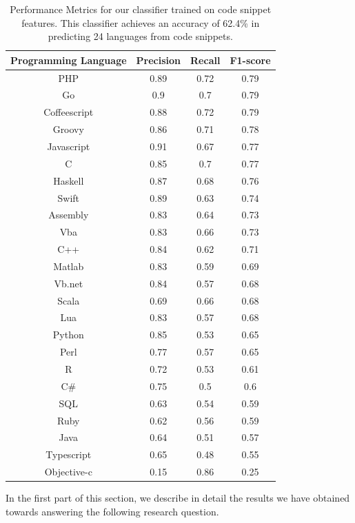 \documentclass[letterpaper, 10 pt, conference]{ieeeconf}  %
\begin{document}
 
\begin{table}[t]
  \centering
  \begin{tabular}{| c | c | c | c |}
     \hline
      Programming Language & Precision & Recall  & F1-score\\ \hline
PHP&	0.89&	0.72&	0.79\\ \hline
Go	&0.9	&0.7&	0.79\\ \hline
Coffeescript&	0.88&	0.72	&0.79\\ \hline
Groovy	&0.86	&0.71	&0.78\\ \hline
Javascript	&0.91&	0.67&	0.77\\ \hline
C	&0.85	&0.7&	0.77\\ \hline
Haskell	&0.87&	0.68	&0.76\\ \hline
Swift	&0.89&	0.63	&0.74\\ \hline
Assembly&	0.83&	0.64&	0.73\\ \hline
Vba&	0.83&	0.66&	0.73\\ \hline
C++	&0.84	&0.62&	0.71\\ \hline
Matlab&	0.83	&0.59&	0.69\\ \hline
Vb.net&	0.84&	0.57	&0.68\\ \hline
Scala&	0.69&	0.66	&0.68\\ \hline
Lua&	0.83&	0.57&	0.68\\ \hline
Python&	0.85&	0.53&	0.65\\ \hline
Perl	&0.77&	0.57&	0.65\\ \hline
R	&0.72	&0.53&	0.61\\ \hline
C\#&	0.75&	0.5&	0.6\\ \hline
SQL&	0.63&	0.54&	0.59\\ \hline
Ruby&	0.62&	0.56&	0.59\\ \hline
Java&	0.64&	0.51&	0.57\\ \hline
Typescript&	0.65&	0.48&	0.55\\ \hline
Objective-c&	0.15&	0.86	&0.25\\ \hline

  \end{tabular}
  \caption{Performance Metrics for our classifier trained on code snippet features. This classifier achieves an accuracy of 62.4\% in predicting 24 languages from code snippets.}
  \label{Table:Code}
\end{table}



In the first part of this section, we describe in detail the results we have obtained towards answering the following research question.
\end{document}
